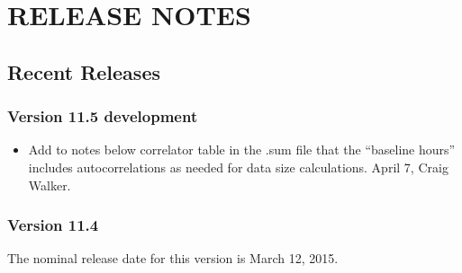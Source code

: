 \documentclass{report}
\begin{document}
\chapter{\label{CHP:CHANG}RELEASE NOTES}


\section{\label{SEC:CURRENT}Recent Releases}





\subsection{\label{SSEC:VER_11.5}Version 11.5 development}

\begin{itemize}

\item Add to notes below correlator table in the .sum file that the
``baseline hours'' includes autocorrelations as needed for data size
calculations.  April 7, Craig Walker.

\end{itemize}


\subsection{\label{SSEC:VER_11.4}Version 11.4}

The nominal release date for this version is March 12, 2015.
\end{document}
